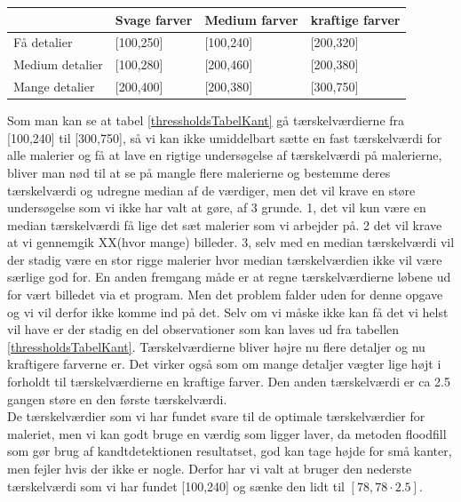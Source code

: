 \begin{tabular}{| l | l | l | l |} \hline
  						& Svage farver 	& Medium farver & kraftige farver \\ \hline
	Få detalier 		& [100,250]		& [100,240]		& [200,320]\\ \hline
	Medium detalier 	& [100,280]		& [200,460]		& [200,380]\\ \hline
	Mange detalier		& [200,400]		& [200,380]		& [300,750]\\ \hline
\end{tabular} \label{thressholdsTabelKant}

Som man kan se at tabel \ref{thressholdsTabelKant} gå tærskelværdierne
fra [100,240] til [300,750], så vi kan ikke umiddelbart sætte en fast
tærskelværdi for alle malerier og få at lave en rigtige undersøgelse af
tærskelværdi på malerierne, bliver man nød til at se på mangle flere
malerierne og bestemme deres tærskelværdi og udregne median af de
værdiger, men det vil krave en støre undersøgelse som vi ikke har valt
at gøre, af 3 grunde. 1, det vil kun være en median tærskelværdi få lige
det sæt malerier som vi arbejder på. 2 det vil krave at vi gennemgik
XX(hvor mange) billeder. 3, selv med en median tærskelværdi vil der
stadig være en stor rigge malerier hvor median tærskelværdien ikke vil
være særlige god for. En anden fremgang måde er at regne
tærskelværdierne løbene ud for vært billedet via et program. Men det
problem falder uden for denne opgave og vi vil derfor ikke komme ind på
det. Selv om vi måske ikke kan få det vi helst vil have er der stadig en
del observationer som kan laves ud fra tabellen
\ref{thressholdsTabelKant}. Tærskelværdierne bliver højre nu flere
detaljer og nu kraftigere farverne er. Det virker også som om mange
detaljer vægter lige højt i forholdt til tærskelværdierne en kraftige
farver. Den anden tærskelværdi er ca 2.5 gangen støre en den første
tærskelværdi.\\

De tærskelværdier som vi har fundet svare til de optimale
tærskelværdier for maleriet, men vi kan godt bruge en værdig som ligger
laver, da metoden floodfill som gør brug af kandtdetektionen resultatset,
god kan tage højde for små kanter, men fejler hvis der ikke er nogle.
Derfor har vi valt at bruger den nederste tærskelværdi som vi har fundet
[100,240] og sænke den lidt til $[78,78 \cdot 2.5 ]$.

